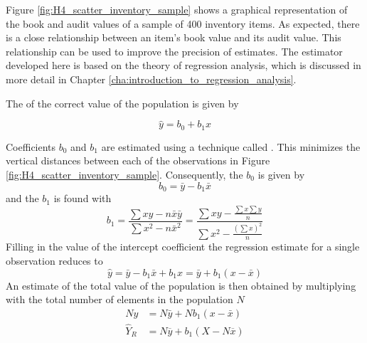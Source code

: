Figure \ref{fig:H4_scatter_inventory_sample} shows a graphical representation of the book and audit values of a sample of 400 inventory items. As expected, there is a close relationship between an item's book value and its audit value. This relationship can be used to improve the precision of estimates. The estimator developed here is based on the theory of regression analysis, which is discussed in more detail in Chapter \ref{cha:introduction_to_regression_analysis}.

\bigskip
The  of the correct value of the population is given by

\begin{equation}
\hat{y} = b_0 + b_1 x
\label{eq:regression equation}
\end{equation}

Coefficients $b_0$ and $b_1$ are estimated using a technique called . This minimizes the vertical distances between each of the observations in Figure \ref{fig:H4_scatter_inventory_sample}. Consequently, the  $b_0$ is given by
\begin{equation}
b_0 = \bar{y} - b_1 \bar{x}
\label{eq:regression_intercept}
\end{equation}
and the  $b_1$ is found with
\begin{equation}
b_1 = \frac{\sum{xy - n \bar{x} \bar{y}}}{\sum{x^2} - n \bar{x}^2} 
 = \frac{\sum{x y} - \frac{\sum{x}\sum{y}}{n}}{\sum{x^2} - \frac{(\sum{x})^2}{n}}
\label{eq:regression_slope}
\end{equation}
Filling in the value of the intercept coefficient the regression estimate for a single observation reduces to
\begin{equation*}
\hat{y} = \bar{y} - b_1 \bar{x} + b_1 x = \bar{y} + b_1(x - \bar{x})
\label{eq:regression_estimate_single}
\end{equation*} 
An estimate of the total value of the population is then obtained by multiplying with the total number of elements in the population $N$
\begin{align}
N \hat{y} &= N \bar{y} + N b_1(x - \bar{x}) \\
\hat{Y}_R &= N \overline{y} + b_1 (X - N \overline{x})
\label{eq:regression_estimate}
\end{align}

